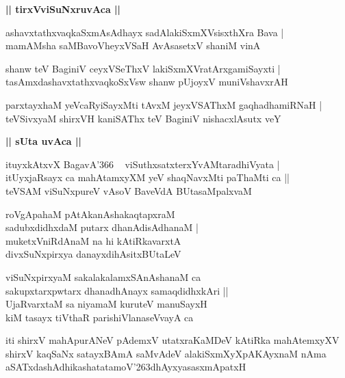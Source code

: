 \documentclass[twoside,12pt,openright]{book}
\def\S{\char'263}
\newcounter{shloka}[chapter]
\def\uvaca#1{\centerline{{\large\textbf{#1}}}}
\begin{document}
\uvaca{|| tirxVviSuNxruvAca ||}

\begin{shloka}%
ashavxtathxvaqkaSxmAsAdhayx sadAlakiSxmXVsisxthXra Bava |\\
mamAMsha saMBavoVheyxVSaH AvAsasetxV shaniM vinA 
\end{shloka}

\begin{shloka}%
shanw teV BaginiV ceyxVSeThxV lakiSxmXVratArxgamiSayxti |\\
tasAmxdashavxtathxvaqkoSxVsw shanw pUjoyxV muniVshavxrAH 
\end{shloka}

\begin{shloka}%
parxtayxhaM yeVcaRyiSayxMti tAvxM jeyxVSAThxM gaqhadhamiRNaH |\\
teVSivxyaM shirxVH kaniSAThx teV BaginiV nishacxlAsutx veY
\end{shloka}

\uvaca{|| sUta uvAca ||}

\begin{shloka}%
ituyxkAtxvX BagavA\char'366 ~ viSuthxsatxterxYvAMtaradhiVyata |\\
itUyxjaRsayx ca mahAtamxyXM yeV shaqNavxMti paThaMti ca ||\\
teVSAM viSuNxpureV vAsoV BaveVdA BUtasaMpalxvaM 
\end{shloka}

\begin{shloka}%
roVgApahaM pAtAkanAshakaqtapxraM \\
sadubxdidhxdaM putarx dhanAdisAdhanaM |\\
muketxVniRdAnaM na hi kAtiRkavarxtA \\
divxSuNxpirxya danayxdihAsitxBUtaLeV 
\end{shloka}

\begin{shloka}%
viSuNxpirxyaM sakalakalamxSAnAshanaM ca \\
sakupxtarxpwtarx dhanadhAnayx samaqdidhxkAri ||\\
UjaRvarxtaM sa niyamaM kuruteV manuSayxH \\
kiM tasayx tiVthaR parishiVlanaseVvayA ca 
\end{shloka}

\begin{center}
iti shirxV mahApurANeV pAdemxV utatxraKaMDeV kAtiRka mahAtemxyXV shirxV kaqSaNx satayxBAmA 
saMvAdeV alakiSxmXyXpAKAyxnaM nAma aSATxdashAdhikashatatamoV\S dhAyxyasasxmApatxH 
\end{center}
\end{document}
